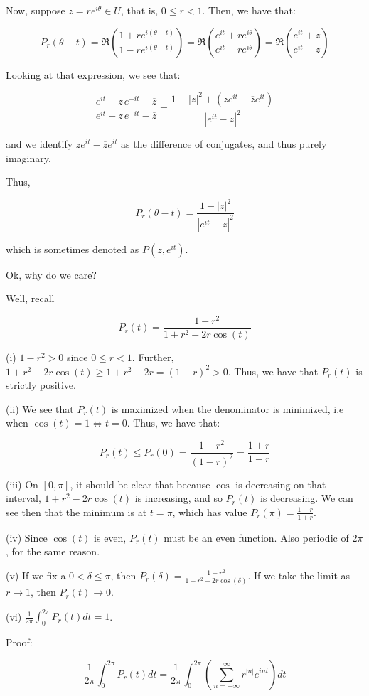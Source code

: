 \documentclass[10pt]{article}
\begin{document}
Now, suppose $z = r e^{i \theta} \in U$, that is, $ 0 \leq r < 1$. Then, we have that:

$$ P_r(\theta -t) = \Re \left( \frac{1 + re^{i(\theta - t)}}{1 - re^{i(\theta - t)}} \right) = \Re \left( \frac{e^{it} + re^{i\theta}}{e^{it}- re^{i\theta}} \right) =  \Re \left( \frac{e^{it} + z}{e^{it}- z} \right)$$

Looking at that expression, we see that:

$$ \frac{e^{it} + z}{e^{it}- z} \frac{e^{-it} - \overline{z}}{e^{-it}- \overline{z} } = \frac{1 - |z|^2 + (ze^{it} - \overline{z} e^{it})}{|e^{it} - z|^2}$$

and we identify $ze^{it} - \overline{z} e^{it}$ as the difference of conjugates, and thus purely imaginary.

Thus, 

$$ P_r(\theta -t) = \frac{1 - |z|^2}{|e^{it} - z|^2}$$

which is sometimes denoted as $P(z,e^{it})$.

Ok, why do we care?

Well, recall

$$P_r(t) = \frac{1 - r^2}{1 + r^2 - 2r\cos(t)}$$

(i) $1 - r^2 > 0$ since $0 \leq r < 1$. Further, $1 + r^2 - 2r\cos(t) \geq 1 + r^2 - 2r  = (1-r)^2 > 0$. Thus, we have that $P_r(t)$ is strictly positive. 

(ii) We see that $P_r(t)$ is maximized when the denominator is minimized, i.e when $\cos(t) = 1 \iff t = 0$. Thus, we have that:

$$ P_r(t) \leq P_r(0) = \frac{1-r^2}{(1-r)^2} = \frac{1+r}{1-r}$$

(iii) On $[0,\pi]$, it should be clear that because $\cos$ is decreasing on that interval, $1 + r^2 - 2r\cos(t)$ is increasing, and so $P_r(t)$ is decreasing. We can see then that the minimum is at $t = \pi$, which has value $P_r(\pi) = \frac{1 - r}{1+r}$.

(iv) Since $\cos(t)$ is even, $P_r(t)$ must be an even function. Also periodic of $2 \pi$, for the same reason.

(v) If we fix a $0 < \delta \leq \pi$, then $P_r(\delta) = \frac{1 - r^2}{1 + r^2 - 2r \cos(\delta)}$. If we take the limit as $r \to 1$, then $P_r(t) \to 0$. 

(vi) $\frac{1}{2\pi} \int_0^{2\pi} P_r(t) dt = 1$.

Proof:

$$\frac{1}{2\pi} \int_0^{2\pi} P_r(t) dt = \frac{1}{2\pi} \int_0^{2\pi} \left( \sum_{n=-\infty}^\infty r^{|n|} e^{int} \right) dt$$
\end{document}
